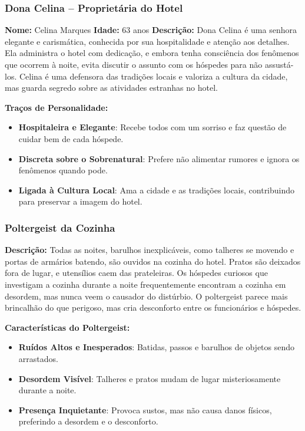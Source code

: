 \begin{personagem}  
\subsubsection{Dona Celina – Proprietária do Hotel}

\textbf{Nome:} Celina Marques  
\textbf{Idade:} 63 anos  
\textbf{Descrição:}  
Dona Celina é uma senhora elegante e carismática, conhecida por sua hospitalidade e atenção aos detalhes. Ela administra o hotel com dedicação, e embora tenha consciência dos fenômenos que ocorrem à noite, evita discutir o assunto com os hóspedes para não assustá-los. Celina é uma defensora das tradições locais e valoriza a cultura da cidade, mas guarda segredo sobre as atividades estranhas no hotel.

\textbf{Traços de Personalidade:}
\begin{itemize}
    \item \textbf{Hospitaleira e Elegante}: Recebe todos com um sorriso e faz questão de cuidar bem de cada hóspede.
    \item \textbf{Discreta sobre o Sobrenatural}: Prefere não alimentar rumores e ignora os fenômenos quando pode.
    \item \textbf{Ligada à Cultura Local}: Ama a cidade e as tradições locais, contribuindo para preservar a imagem do hotel.
\end{itemize}
\end{personagem}
\begin{personagem}  
\subsubsection{Poltergeist da Cozinha}

\textbf{Descrição:}  
Todas as noites, barulhos inexplicáveis, como talheres se movendo e portas de armários batendo, são ouvidos na cozinha do hotel. Pratos são deixados fora de lugar, e utensílios caem das prateleiras. Os hóspedes curiosos que investigam a cozinha durante a noite frequentemente encontram a cozinha em desordem, mas nunca veem o causador do distúrbio. O poltergeist parece mais brincalhão do que perigoso, mas cria desconforto entre os funcionários e hóspedes.

\textbf{Características do Poltergeist:}
\begin{itemize}
    \item \textbf{Ruídos Altos e Inesperados}: Batidas, passos e barulhos de objetos sendo arrastados.
    \item \textbf{Desordem Visível}: Talheres e pratos mudam de lugar misteriosamente durante a noite.
    \item \textbf{Presença Inquietante}: Provoca sustos, mas não causa danos físicos, preferindo a desordem e o desconforto.
\end{itemize}
\end{personagem}
